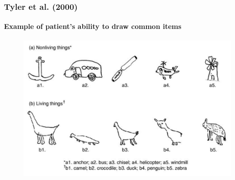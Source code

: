 \documentclass{beamer}
\begin{document}
\begin{frame}[fragile]
\frametitle{Tyler et al. (2000)}
\framesubtitle{Example of patient's ability to draw common items}

\begin{figure}[t]
 \begin{flushleft}
\centering
 \includegraphics[scale=.26]{./fig/taylor_2000.png}


 \end{flushleft}

 \end{figure}
\end{frame}
\end{document}
